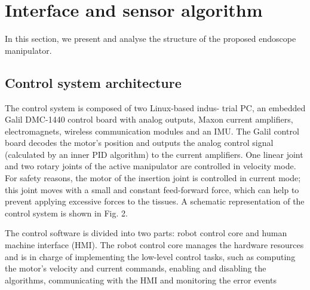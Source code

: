 \documentclass[journal,twoside]{IEEEtran}
\theoremstyle{definition}
\begin{document}
\section{Interface and sensor algorithm}\label{sec:design}
In this section, we present and analyse the structure of the proposed endoscope manipulator. 

\subsection{Control system architecture}

The control system is composed of two Linux-based indus-
trial PC, an embedded Galil DMC-1440 control board with
analog outputs, Maxon current amplifiers, electromagnets,
wireless communication modules and an IMU. The Galil
control board decodes the motor’s position and outputs the
analog control signal (calculated by an inner PID algorithm)
to the current amplifiers. One linear joint and two rotary
joints of the active manipulator are controlled in velocity
mode. For safety reasons, the motor of the insertion joint
is controlled in current mode; this joint moves with a
small and constant feed-forward force, which can help to
prevent applying excessive forces to the tissues. A schematic
representation of the control system is shown in Fig. 2.



The control software
is divided into two parts: robot control core and human
machine interface (HMI). The robot control core manages
the hardware resources and is in charge of implementing
the low-level control tasks, such as computing the motor’s
velocity and current commands, enabling and disabling the
algorithms, communicating with the HMI and monitoring the
error events

\end{document}
